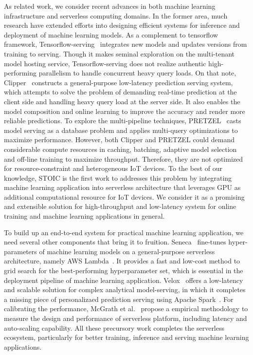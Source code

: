 As related work, we consider recent advances in both machine learning infrastructure and serverless computing domains. In the former area, much research have extended efforts into designing efficient systems for inference and deployment of machine learning models. As a complement to tensorflow framework, Tensorflow-serving~\cite{ref:tensorflow-serving} integrates new models and updates versions from training to serving. Though it makes seminal exploration on the multi-tenant model hosting service, Tensorflow-serving does not realize authentic high-performing parallelism to handle concurrent heavy query loads. On that note, Clipper~\cite{ref:clipper} constructs a general-purpose low-latency prediction serving system, which attempts to solve the problem of demanding real-time prediction at the client side and handling heavy query load at the server side. It also enables the model composition and online learning to improve the accuracy and render more reliable predictions. To explore the multi-pipeline techniques, PRETZEL~\cite{ref:pretzel} casts model serving as a database problem and applies multi-query optimizations to maximize performance. However, both Clipper and PRETZEL could demand considerable compute resources in caching, batching, adaptive model selection and off-line training to maximize throughput. Therefore, they are not optimized for resource-constraint and heterogeneous IoT devices. To the best of our knowledge, STOIC is the first work to addresses this problem by integrating machine learning application into serverless architecture that leverages GPU as additional computational resource for IoT devices. We consider it as a promising and extensible solution for high-throughput and low-latency system for online training and machine learning applications in general. 

 To build up an end-to-end system for practical machine learning application, we need several other components that bring it to fruition. Seneca~\cite{ref:seneca} fine-tunes hyper-parameters of machine learning models on a general-purpose serverless architecture, namely AWS Lambda~\cite{ref:lambda}. It provides a fast and low-cost method to grid search for the best-performing hyperparameter set, which is essential in the deployment pipeline of machine learning application. Velox~\cite{ref:velox} offers a low-latency and scalable solution for complex analytical model-serving, in which it completes a missing piece of personalizaed prediction serving using Apache Spark~\cite{ref:spark}. For calibrating the performance, McGrath et al.~\cite{ref:serverless} propose a empirical methodology to measure the design and performance of serverless platform, including latency and auto-scaling capability. All these precursory work completes the serverless ecosystem, particularly for better training, inference and serving machine learning applications.